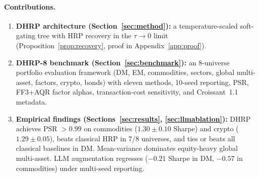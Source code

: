 \paragraph{Contributions.}
\begin{enumerate}\itemsep0.05em
\item \textbf{DHRP architecture (Section~\ref{sec:method}):} a
  temperature-scaled soft-gating tree with HRP recovery in the
  $\tau \to 0$ limit (Proposition~\ref{prop:recovery}, proof in
  Appendix~\ref{app:proof}).
\item \textbf{DHRP-8 benchmark (Section~\ref{sec:benchmark}):} an
  8-universe portfolio evaluation framework (DM, EM, commodities,
  sectors, global multi-asset, factors, crypto, bonds) with eleven
  methods, 10-seed reporting, PSR, FF3+AQR factor alphas,
  transaction-cost sensitivity, and Croissant~1.1 metadata.
\item \textbf{Empirical findings (Sections~\ref{sec:results},
  \ref{sec:llmablation}):} DHRP achieves PSR $> 0.99$ on commodities
  ($1.30 \pm 0.10$ Sharpe) and crypto ($1.29 \pm 0.05$), beats
  classical HRP in 7/8 universes, and ties or beats all classical
  baselines in DM. Mean-variance dominates equity-heavy global
  multi-asset. LLM augmentation regresses ($-0.21$ Sharpe in DM,
  $-0.57$ in commodities) under multi-seed reporting.
\end{enumerate}
